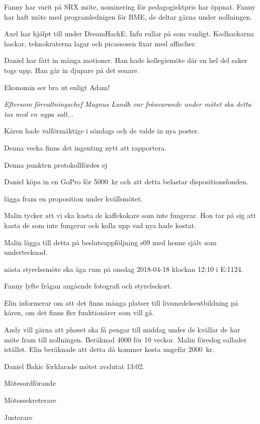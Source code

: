\documentclass[10pt]{article}
\def\mo{Daniel Bakic}
\def\ms{Axel Voss}
\def\ji{Alexander Wik}
\begin{document}
\begin{paragrafer}
\begin{paragrafer}
		Fanny har varit på SRX möte, nominering för pedagogisktpris har öppnat. Fanny har haft möte med programlednigen för BME, de deltar gärna under nollningen.

		Axel har hjälpt till under DreamHackE. Infu rullar på som vanligt. Kodhackarna hackar, teknokraterna lagar och picassosen fixar med affischer.

		Daniel har fått in många motioner. Han hade kollegiemöte där en hel del saker togs upp. Han går in djupare på det senare.


		Ekonomin ser bra ut enligt Adam!

		\emph{Eftersom förvaltningschef Magnus Lundh var frånvarande under mötet ska detta tas med en nypa salt...}


		Kåren hade valförmäktige i söndags och de valde in nya poster.


		Denna vecka finns det ingenting nytt att rapportera.


	\end{paragrafer}



	Denna punkten protokollfördes ej


	Daniel \ypa köpa in en GoPro för \SI{5000}{kr} och att detta belastar dispositionsfonden.

	\Mbaby

	\Mba lägga fram en proposition under kvällsmötet.


	Malin tycker att vi ska kasta de kaffekokare som inte fungerar. Hon tar på sig att kasta de som inte fungerar och kolla upp vad nya hade kostat.

	Malin \ypa lägga till detta på beslutsuppföljning s09 med henne själv som undertecknad.

	\Mbaby
	\Mba nästa styrelsemöte ska äga rum på onsdag 2018-04-18 klockan 12:10 i E:1124.


	\Ibfu



	Fanny lyfte frågan angående fotografi och styrelsekort.

	Elin informerar om att det finns många platser till livsmedelseutbildning på kåren, om det finns fler funktionärer som vill gå.

	Andy vill gärna att phøset ska få pengar till middag under de kvällar de har möte fram till nollningen. Beräknad 4000 för 10 veckor. Malin föreslog sallader istället. Elin beräknade att detta då kommer kosta ungefär \SI{2000}{kr}.

	{\mo} förklarade mötet avslutat 13:02.
\end{paragrafer}

\hidesignfoot
\begin{signatures}{3}
	\signature{\mo}{Mötesordförande}
	\signature{\ms}{Mötessekreterare}
	\signature{\ji}{Justerare}
\end{signatures}
\end{document}
